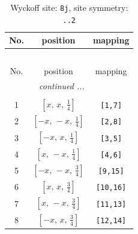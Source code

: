 \documentclass[fleqn,8pt]{jsarticle}
\begin{document}
\begin{longtable}{ccc}
\caption{Wyckoff site: {\tt 8j}, site symmetry: {\tt ..2}}
 \\
 \hline \hline
No. & position & mapping \\ \hline \endfirsthead

\multicolumn{2}{l}{\tablename\ \thetable{}} \\
 \hline \hline
No. & position & mapping \\ \hline \endhead

 \hline \hline
\multicolumn{2}{r}{\footnotesize\it continued ...} \\ \endfoot

 \hline \hline
\multicolumn{2}{r}{} \\ \endlastfoot

1 & $\left[ x,\, x,\, \frac{1}{4} \right]$ & {\tt [1,7]} \\ \hline
2 & $\left[ - x,\, - x,\, \frac{1}{4} \right]$ & {\tt [2,8]} \\ \hline
3 & $\left[ - x,\, x,\, \frac{1}{4} \right]$ & {\tt [3,5]} \\ \hline
4 & $\left[ x,\, - x,\, \frac{1}{4} \right]$ & {\tt [4,6]} \\ \hline
5 & $\left[ - x,\, - x,\, \frac{3}{4} \right]$ & {\tt [9,15]} \\ \hline
6 & $\left[ x,\, x,\, \frac{3}{4} \right]$ & {\tt [10,16]} \\ \hline
7 & $\left[ x,\, - x,\, \frac{3}{4} \right]$ & {\tt [11,13]} \\ \hline
8 & $\left[ - x,\, x,\, \frac{3}{4} \right]$ & {\tt [12,14]} \\
\end{longtable}
\renewcommand{\arraystretch}{1.2}
\end{document}
